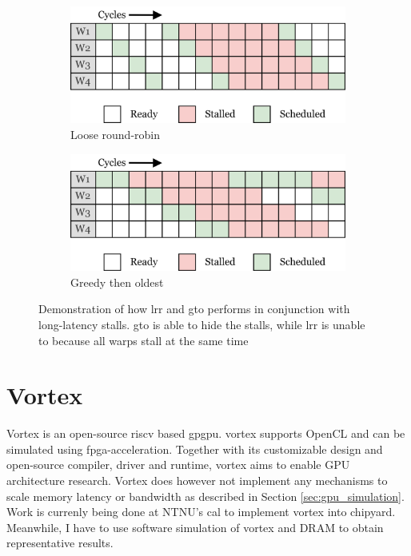 \begin{figure}
     \centering
     \begin{subfigure}[b]{0.45\textwidth}
         \centering
         \includegraphics[width=\textwidth]{figures/warp-scheduling-lrr-stall.png}
         \caption{Loose round-robin}
         \label{fig:lrr-lls}
     \end{subfigure}
     \hfill
     \begin{subfigure}[b]{0.45\textwidth}
         \centering
         \includegraphics[width=\textwidth]{figures/warp-scheduling-gto-stall.png}
         \caption{Greedy then oldest}
         \label{fig:gto-lls}
     \end{subfigure}
        \caption[Demonstration of how \acrshort{lrr} and \acrshort{gto} handles long-latency stalls]{Demonstration of how \acrshort{lrr} and \acrshort{gto} performs in conjunction with long-latency stalls. \acrshort{gto} is able to hide the stalls, while \acrshort{lrr} is unable to because all warps stall at the same time}
        \label{fig:lrr-gto-lls}
\end{figure}

\section{Vortex}

Vortex\cite{vortex} is an open-source \gls{riscv} based \acrshort{gpgpu}. \Gls{vortex} supports OpenCL and can be simulated using \acrshort{fpga}-acceleration. Together with its customizable design and open-source compiler, driver and runtime, \Gls{vortex} aims to enable GPU architecture research. Vortex does however  not implement any mechanisms to scale memory latency or bandwidth as described in Section \ref{sec:gpu_simulation}. Work is currenly being done at NTNU's \acrfull{cal} to implement \Gls{vortex} into chipyard. Meanwhile, I have to use software simulation of \Gls{vortex} and DRAM to obtain representative results.

